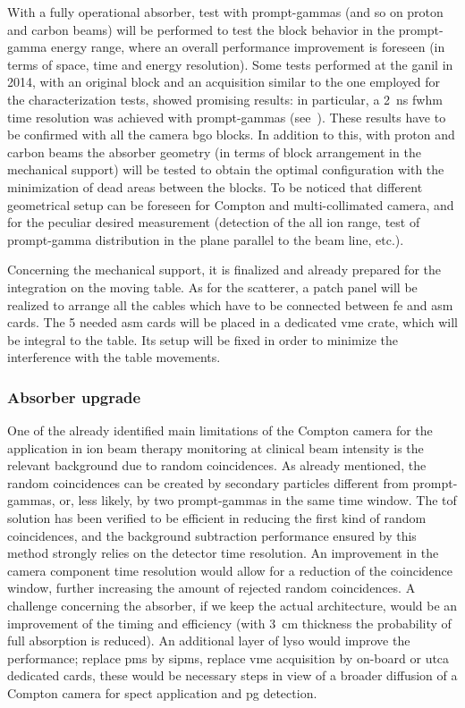 With a fully operational absorber, test with prompt-gammas (and so on proton and carbon beams) will be performed to test the block behavior in the prompt-gamma energy range, where an overall performance improvement is foreseen (in terms of space, time and energy resolution). Some tests performed at the \gls{ganil} in 2014, with an original block and an acquisition similar to the one employed for the characterization tests, showed promising results: in particular, a 2~ns \gls{fwhm} time resolution was achieved with prompt-gammas (see~\cite{Ley2015}). These results have to be confirmed with all the camera \gls{bgo} blocks. In addition to this, with proton and carbon beams the absorber geometry (in terms of block arrangement in the mechanical support) will be tested to obtain the optimal configuration with the minimization of dead areas between the blocks. To be noticed that different geometrical setup can be foreseen for Compton and multi-collimated camera, and for the peculiar desired measurement (detection of the all ion range, test of prompt-gamma distribution in the plane parallel to the beam line, etc.).

Concerning the mechanical support, it is finalized and already prepared for the integration on the moving table. As for the scatterer, a patch panel will be realized to arrange all the cables which have to be connected between \gls{fe} and \gls{asm} cards. The 5 needed \gls{asm} cards will be placed in a dedicated \gls{vme} crate, which will be integral to the table. Its setup will be fixed in order to minimize the interference with the table movements.

\subsubsection{Absorber upgrade}\label{chap3::subsubsec::absUpgrade} 

One of the already identified main limitations of the Compton camera for the application in ion beam therapy monitoring at clinical beam intensity is the relevant background due to random coincidences. As already mentioned, the random coincidences can be created by secondary particles different from prompt-gammas, or, less likely, by two prompt-gammas in the same time window. The \gls{tof} solution has been verified to be efficient in reducing the first kind of random coincidences, and the background subtraction performance ensured by this method strongly relies on the detector time resolution. An improvement in the camera component time resolution would allow for a reduction of the coincidence window, further increasing the amount of rejected random coincidences. 
A challenge concerning the absorber, if we keep the actual architecture, would be an improvement of the timing and efficiency (with 3~cm thickness the probability of full absorption is reduced). An additional layer of \gls{lyso} would improve the performance; replace \glspl{pm} by \glspl{sipm}, replace \gls{vme} acquisition by on-board or \gls{utca} dedicated cards, these would be necessary steps in view of a broader diffusion of a Compton camera for \gls{spect} application and \gls{pg} detection.

